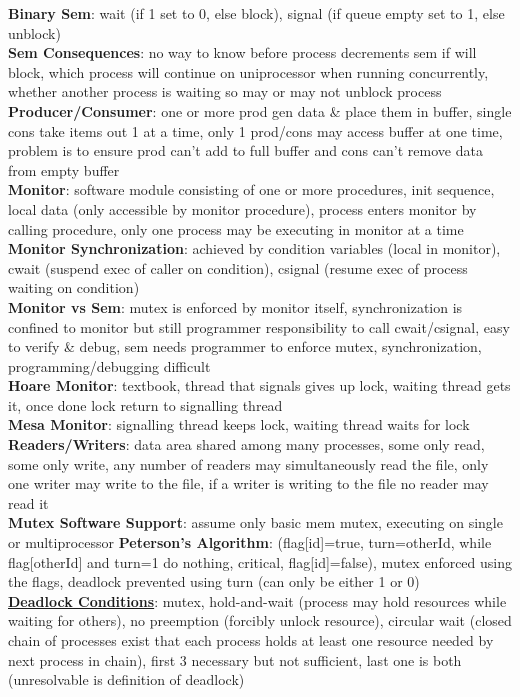 \documentclass[a4paper]{article}
\begin{document}
\begin{multicols}{2}
        \textbf{Binary Sem}: wait (if 1 set to 0, else block), signal (if queue empty set to 1, else unblock)\\
        \textbf{Sem Consequences}: no way to know before process decrements sem if will block, which process will continue on uniprocessor when running concurrently, whether another process is waiting so may or may not unblock process\\
        \textbf{Producer/Consumer}: one or more prod gen data \& place them in buffer, single cons take items out 1 at a time, only 1 prod/cons may access buffer at one time, problem is to ensure prod can't add to full buffer and cons can't remove data from empty buffer\\
        \textbf{Monitor}: software module consisting of one or more procedures, init sequence, local data (only accessible by monitor procedure), process enters monitor by calling procedure, only one process may be executing in monitor at a time\\
        \textbf{Monitor Synchronization}: achieved by condition variables (local in monitor), cwait (suspend exec of caller on condition), csignal (resume exec of process waiting on condition)\\
        \textbf{Monitor vs Sem}: mutex is enforced by monitor itself, synchronization is confined to monitor but still programmer responsibility to call cwait/csignal, easy to verify \& debug, sem needs programmer to enforce mutex, synchronization, programming/debugging difficult\\
        \textbf{Hoare Monitor}: textbook, thread that signals gives up lock, waiting thread gets it, once done lock return to signalling thread\\
        \textbf{Mesa Monitor}: signalling thread keeps lock, waiting thread waits for lock\\
        \textbf{Readers/Writers}: data area shared among many processes, some only read, some only write, any number of readers may simultaneously read the file, only one writer may write to the file, if a writer is writing to the file no reader may read it\\
        \textbf{Mutex Software Support}: assume only basic mem mutex, executing on single or multiprocessor
        \textbf{Peterson's Algorithm}: (flag[id]=true, turn=otherId, while flag[otherId] and turn=1 do nothing, critical, flag[id]=false), mutex enforced using the flags, deadlock prevented using turn (can only be either 1 or 0)\\
        \underline{\textbf{Deadlock Conditions}}: mutex, hold-and-wait (process may hold resources while waiting for others), no preemption (forcibly unlock resource), circular wait (closed chain of processes exist that each process holds at least one resource needed by next process in chain), first 3 necessary but not sufficient, last one is both (unresolvable is definition of deadlock)\\

\end{multicols}
\end{document}
